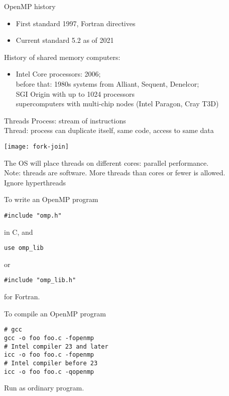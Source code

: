 \begin{numberedframe}{OpenMP history}
  \begin{itemize}
  \item First standard 1997, Fortran directives
  \item Current standard 5.2 as of 2021
  \end{itemize}
  History of shared memory computers:
  \begin{itemize}
  \item Intel Core processors: 2006;\\
    before that: 1980s systems from Alliant, Sequent, Denelcor;\\
    SGI Origin with up to 1024 processors\\
    supercomputers with multi-chip nodes (Intel Paragon, Cray T3D)
  \end{itemize}
\end{numberedframe}

\begin{numberedframe}{Threads}
  Process: stream of instructions\\
  Thread: process can duplicate itself, same code, access to same data

  \texttt{[image: fork-join]}

  The OS will place threads on different cores: parallel
  performance.\\
  Note: threads are software. More threads than cores or fewer is allowed.\\
  Ignore hyperthreads
\end{numberedframe}

\begin{numberedframe}{To write an OpenMP program}
\begin{lstlisting}
#include "omp.h"
\end{lstlisting}
in C, and 
\begin{lstlisting}
use omp_lib
\end{lstlisting}
or
\begin{lstlisting}
#include "omp_lib.h"
\end{lstlisting}
for Fortran.  
\end{numberedframe}

\begin{numberedframe}{To compile an OpenMP program}
\begin{verbatim}
# gcc
gcc -o foo foo.c -fopenmp
# Intel compiler 23 and later
icc -o foo foo.c -fopenmp
# Intel compiler before 23 
icc -o foo foo.c -qopenmp
\end{verbatim}
Run as ordinary program.
\end{numberedframe}

